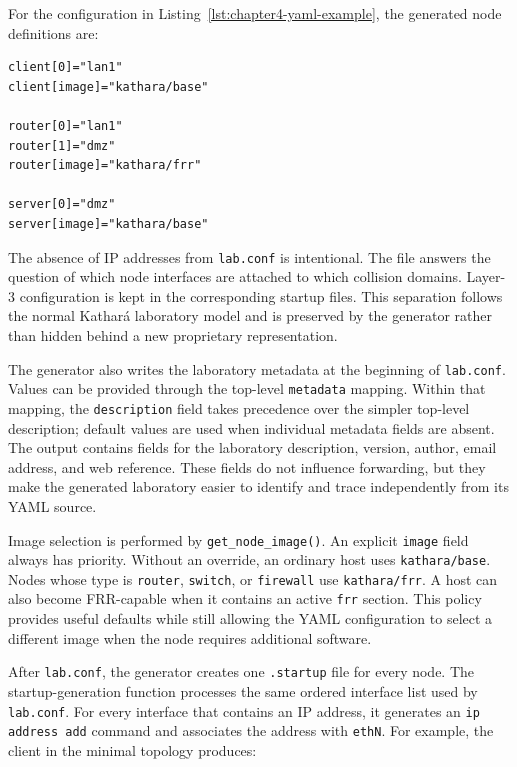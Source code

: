 For the configuration in Listing~\ref{lst:chapter4-yaml-example}, the generated
node definitions are:

\begin{lstlisting}[caption={Topology entries generated in lab.conf.},label={lst:generated-labconf}]
client[0]="lan1"
client[image]="kathara/base"

router[0]="lan1"
router[1]="dmz"
router[image]="kathara/frr"

server[0]="dmz"
server[image]="kathara/base"
\end{lstlisting}

The absence of IP addresses from \texttt{lab.conf} is intentional. The file
answers the question of which node interfaces are attached to which collision
domains. Layer-3 configuration is kept in the corresponding startup files. This
separation follows the normal Kathar\'a laboratory model and is preserved by
the generator rather than hidden behind a new proprietary representation.

The generator also writes the laboratory metadata at the beginning of
\texttt{lab.conf}. Values can be provided through the top-level
\texttt{metadata} mapping. Within that mapping, the \texttt{description}
field takes precedence over the simpler top-level description; default values
are used when individual metadata fields are absent. The output contains fields
for the laboratory description, version, author, email address, and web
reference. These fields do not influence
forwarding, but they make the generated laboratory easier to identify and
trace independently from its YAML source.

Image selection is performed by \texttt{get\_node\_image()}. An explicit
\texttt{image} field always has priority. Without an override, an ordinary host
uses \texttt{kathara/base}. Nodes whose type is \texttt{router},
\texttt{switch}, or \texttt{firewall} use \texttt{kathara/frr}. A host can also
become FRR-capable when it contains an active \texttt{frr} section. This policy
provides useful defaults while still allowing the YAML configuration to select
a different image when the node requires additional software.

After \texttt{lab.conf}, the generator creates one \texttt{.startup} file
for every node. The startup-generation function processes the same ordered
interface list used by \texttt{lab.conf}. For every interface that
contains an IP address, it generates an \texttt{ip address add} command and
associates the address with \texttt{ethN}. For example, the client in the
minimal topology produces:

